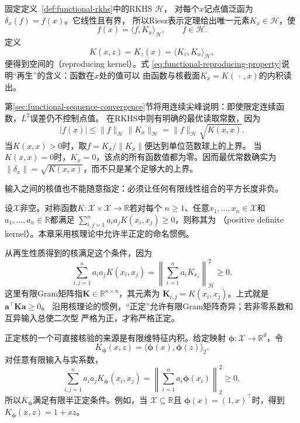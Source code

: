 固定定义~\ref{def:functional-rkhs}中的RKHS $\mathcal H$，
对每个$x$记点值泛函为$\delta_x(f)=f(x)$。它线性且有界，
所以Riesz表示定理给出唯一元素$K_x\in\mathcal{H}$，使
\begin{equation}
  f(x)=\langle f,K_x\rangle_{\mathcal{H}},
  \qquad f\in\mathcal{H}.
  \label{eq:functional-reproducing-property}
\end{equation}
定义
\[
  K(x,z)=K_z(x)
  =\langle K_z,K_x\rangle_{\mathcal{H}},
\]
便得到空间的（reproducing kernel）。式
\eqref{eq:functional-reproducing-property}说明“再生”的含义：函数在$x$处的值可以
由函数与核截面$K_x=K(\,\cdot\,,x)$的内积读出。

第\ref{sec:functional-sequence-convergence}节将用连续尖峰说明：即使限定连续函数，$L^2$误差仍不控制点值。
在RKHS中则有明确的最优读取常数，因为
\begin{equation}
  |f(x)|
  \leq
  \lVert f\rVert_{\mathcal{H}}
  \lVert K_x\rVert_{\mathcal{H}}
  =
  \lVert f\rVert_{\mathcal{H}}\sqrt{K(x,x)}.
  \label{eq:functional-rkhs-pointwise-bound}
\end{equation}
当$K(x,x)>0$时，取$f=K_x/\lVert K_x\rVert$便达到单位范数球上的上界。
当$K(x,x)=0$时，$K_x=0$，该点的所有函数值都为零。因而最优常数确实为
$\lVert\delta_x\rVert=\sqrt{K(x,x)}$，而不只是某个足够大的上界。

输入之间的核值也不能随意指定：必须让任何有限线性组合的平方长度非负。
\begin{definition}[实正定核]
\label{def:functional-positive-definite-kernel}
设$\mathcal X$非空。对称函数$K:\mathcal X\times\mathcal X\to\mathbb R$若对每个
$n\geq1$、任意$x_1,\ldots,x_n\in\mathcal X$和$a_1,\ldots,a_n\in\mathbb R$都满足
$\sum_{i,j=1}^n a_i a_jK(x_i,x_j)\geq0$，则称其为
（positive definite kernel）。本章采用核理论中允许半正定的命名惯例。
\end{definition}
从再生性质得到的核满足这个条件，因为
\begin{equation}
  \sum_{i,j=1}^{n}a_i a_jK(x_i,x_j)
  =
  \left\lVert\sum_{i=1}^{n}a_iK_{x_i}\right\rVert_{\mathcal{H}}^2
  \geq0.
  \label{eq:functional-positive-definite-kernel}
\end{equation}
这里有限Gram矩阵指$\bm K\in\mathbb R^{n\times n}$，其元素为
$\bm K_{i,j}=K(x_i,x_j)$。上式就是$\bm a^\top\bm K\bm a\geq0$。
沿用核理论的惯例，“正定”允许有限Gram矩阵奇异；若非零系数和互异输入总使二次型
严格为正，才称严格正定。

正定核的一个可直接核验的来源是有限维特征内积。给定映射
$\bm{\phi}:\mathcal{X}\to\mathbb{R}^d$，令
\[
  K_{\bm{\phi}}(x,z)
  =
  \langle\bm{\phi}(x),\bm{\phi}(z)\rangle_2.
\]
对任意有限输入与实系数，
\[
  \sum_{i,j=1}^{n}a_i a_jK_{\bm{\phi}}(x_i,x_j)
  =
  \left\lVert
    \sum_{i=1}^{n}a_i\bm{\phi}(x_i)
  \right\rVert_2^2
  \geq0,
\]
所以$K_{\bm{\phi}}$满足有限半正定条件。例如，当
$\mathcal{X}\subseteq\mathbb{R}$且
$\bm{\phi}(x)=(1,x)^{\top}$时，得到$K_{\bm{\phi}}(x,z)=1+xz$。

